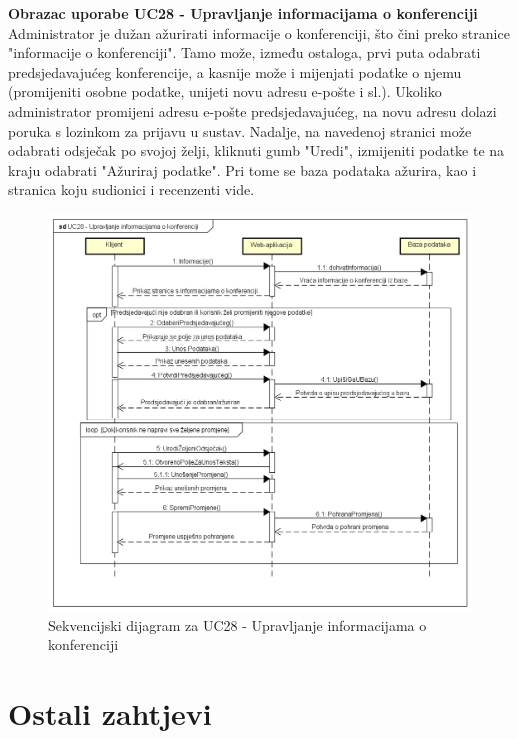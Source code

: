 				\eject

				\textbf{Obrazac uporabe UC28 - Upravljanje informacijama o konferenciji}\\
				Administrator je dužan ažurirati informacije o konferenciji, što čini preko stranice "informacije o konferenciji". Tamo može, između ostaloga, prvi puta odabrati predsjedavajućeg konferencije, a kasnije može i mijenjati podatke o njemu (promijeniti osobne podatke, unijeti novu adresu e-pošte i sl.). Ukoliko administrator promijeni adresu e-pošte predsjedavajućeg, na novu adresu dolazi poruka s lozinkom za prijavu u sustav. Nadalje, na navedenoj stranici može odabrati odsječak po svojoj želji, kliknuti gumb "Uredi", izmijeniti podatke te na kraju odabrati "Ažuriraj podatke". Pri tome se baza podataka ažurira, kao i stranica koju sudionici i recenzenti vide.
				\eject

				\begin{figure}[H]
					\includegraphics[scale=0.50]{dijagrami/UC28-UprInfoAdmin.png} 
					\centering
					\caption{Sekvencijski dijagram za UC28 - Upravljanje informacijama o konferenciji}
					\label{fig:sekvencijski4}
				\end{figure}

				\eject

	
		\section{Ostali zahtjevi}
		
